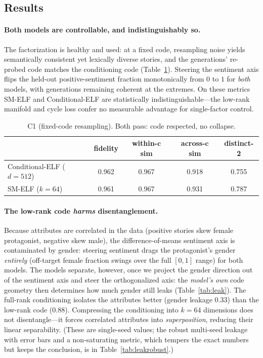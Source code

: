 \documentclass[11pt]{article}
\newcommand{\cb}{\bm{c}}
\begin{document}
\subsection{Results}

\paragraph{Both models are controllable, and indistinguishably so.}
The factorization is healthy and used: at a fixed code, resampling noise yields
semantically consistent yet lexically diverse stories, and the generations'
re-probed code matches the conditioning code (Table~\ref{tab:c1}). Steering the
sentiment axis flips the held-out positive-sentiment fraction monotonically from
$0$ to $1$ for \emph{both} models, with generations remaining coherent at the
extremes. On these metrics SM-ELF and Conditional-ELF are statistically
indistinguishable---the low-rank manifold and cycle loss confer no measurable
advantage for single-factor control.

\begin{table}[h]\centering\small
\begin{tabular}{lcccc}
& fidelity & within-$\cb$ sim & across-$\cb$ sim & distinct-2 \\
\hline
Conditional-ELF ($d{=}512$) & 0.962 & 0.967 & 0.918 & 0.755 \\
SM-ELF ($k{=}64$)           & 0.961 & 0.967 & 0.931 & 0.787 \\
\end{tabular}
\caption{C1 (fixed-code resampling). Both pass: code respected, no collapse.}
\label{tab:c1}
\end{table}

\paragraph{The low-rank code \emph{harms} disentanglement.}
Because attributes are correlated in the data (positive stories skew female
protagonist, negative skew male), the difference-of-means sentiment axis is
contaminated by gender: steering sentiment drags the protagonist's gender
\emph{entirely} (off-target female fraction swings over the full $[0,1]$ range)
for both models. The models separate, however, once we project the gender
direction out of the sentiment axis and steer the orthogonalized axis: the
\emph{model's own} code geometry then determines how much gender still leaks
(Table~\ref{tab:leak}). The full-rank conditioning isolates the attributes
better (gender leakage $0.33$) than the low-rank code ($0.88$). Compressing the
conditioning into $k{=}64$ dimensions does not disentangle---it forces correlated
attributes into \emph{superposition}, reducing their linear separability. (These
are single-seed values; the robust multi-seed leakage with error bars and a
non-saturating metric, which tempers the exact numbers but keeps the conclusion,
is in Table~\ref{tab:leakrobust}.)
\end{document}
